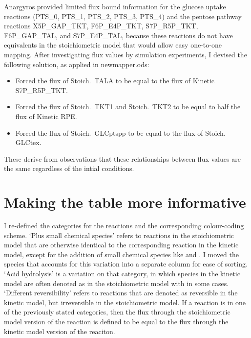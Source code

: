 \documentclass[parskip=full]{scrreprt}
\begin{document}
Anargyros provided limited flux bound information for the glucose uptake reactions (PTS\_0, PTS\_1, PTS\_2, PTS\_3, PTS\_4) and the pentose pathway reactions X5P\_GAP\_TKT, F6P\_E4P\_TKT, S7P\_R5P\_TKT, F6P\_GAP\_TAL, and S7P\_E4P\_TAL, because these reactions do not have equivalents in the stoichiometric model that would allow easy one-to-one mapping. After investigating flux values by simulation experiments, I devised the following solution, as applied in newmapper.ods:

\begin{itemize}
\item Forced the flux of Stoich.\ TALA to be equal to the flux of Kinetic S7P\_R5P\_TKT.
\item Forced the flux of Stoich.\ TKT1 and Stoich.\ TKT2 to be equal to half the flux of Kinetic RPE.
\item Forced the flux of Stoich.\ GLCptspp to be equal to the flux of Stoich. GLCtex.
\end{itemize}

These derive from observations that these relationships between flux values are the same regardless of the intial conditions.

\chapter{Making the table more informative}
\label{ch:moreinformative}

I re-defined the categories for the reactions and the corresponding colour-coding scheme. `Plus small chemical species' refers to reactions in the stoichiometric model that are otherwise identical to the corresponding reaction in the kinetic model, except for the addition of small chemical species like  and . I moved the species that accounts for this variation into a separate column for ease of sorting. `Acid hydrolysis' is a variation on that category, in which  species in the kinetic model are often denoted as  in the stoichiometric model with  in some cases. `Different reversibility' refers to reactions that are denoted as reversible in the kinetic model, but irreversible in the stoichiometric model. If a reaction is in one of the previously stated categories, then the flux through the stoichiometric model version of the reaction is defined to be equal to the flux through the kinetic model version of the reaciton.
\end{document}
